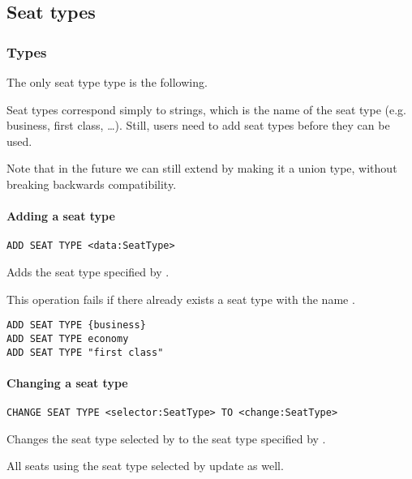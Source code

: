 \subsection{Seat types}

\subsubsection{Types}
The only seat type type is the following.
\begin{description}
  \item[] 
\end{description}
Seat types correspond simply to strings, which is the name of the seat type
(e.g. business, first class, …). Still, users need to add seat types before
they can be used.

Note that in the future we can still extend  by making it a union
type, without breaking backwards compatibility.

\paragraph{Adding a seat type}
\begin{operation}
  \lstinline{ADD SEAT TYPE <data:SeatType>}
\end{operation}
Adds the seat type specified by .

This operation fails if there already exists a seat type with the name
.

\begin{texa}
  \begin{lstlisting}
ADD SEAT TYPE {business}
ADD SEAT TYPE economy
ADD SEAT TYPE "first class"
  \end{lstlisting}
\end{texa}

\paragraph{Changing a seat type}
\begin{operation}
  \lstinline{CHANGE SEAT TYPE <selector:SeatType> TO <change:SeatType>}
\end{operation}
Changes the seat type selected by  to the seat type specified by
.

All seats using the seat type selected by  update as well.

